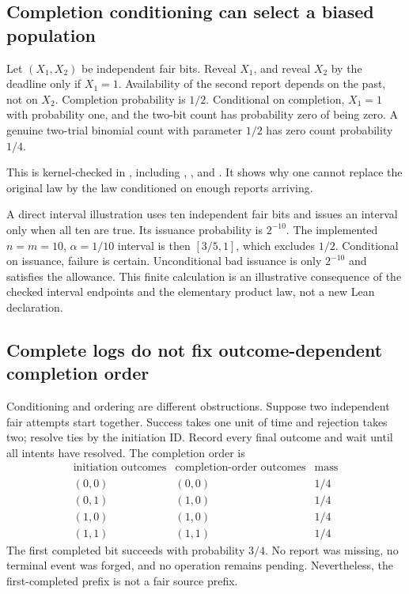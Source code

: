 \subsection{Completion conditioning can select a biased population}

\begin{example}
Let $(X_1,X_2)$ be independent fair bits. Reveal $X_1$, and reveal $X_2$ by the
deadline only if $X_1=1$. Availability of the second report depends on the past,
not on $X_2$. Completion probability is $1/2$. Conditional on completion,
$X_1=1$ with probability one, and the two-bit count has probability zero of
being zero. A genuine two-trial binomial count with parameter $1/2$ has zero
count probability $1/4$.
\end{example}

This is kernel-checked in , including
,
, and
. It shows why one cannot
replace the original law by the law conditioned on enough reports arriving.

A direct interval illustration uses ten independent fair bits and issues an
interval only when all ten are true. Its issuance probability is $2^{-10}$.
The implemented $n=m=10$, $\alpha=1/10$ interval is then $[3/5,1]$, which excludes
$1/2$. Conditional on issuance, failure is certain. Unconditional bad issuance
is only $2^{-10}$ and satisfies the allowance. This finite calculation is an
illustrative consequence of the checked interval endpoints and the elementary
product law, not a new Lean declaration.

\subsection{Complete logs do not fix outcome-dependent completion order}

Conditioning and ordering are different obstructions. Suppose two independent
fair attempts start together. Success takes one unit of time and rejection
takes two; resolve ties by the initiation ID. Record every final outcome and
wait until all intents have resolved. The completion order is
\[
\begin{array}{c|c|c}
\text{initiation outcomes}&\text{completion-order outcomes}&\text{mass}\\\hline
(0,0)&(0,0)&1/4\\
(0,1)&(1,0)&1/4\\
(1,0)&(1,0)&1/4\\
(1,1)&(1,1)&1/4
\end{array}
\]
The first completed bit succeeds with probability $3/4$. No report was missing,
no terminal event was forged, and no operation remains pending. Nevertheless,
the first-completed prefix is not a fair source prefix.

